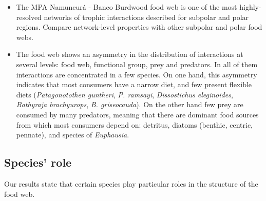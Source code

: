 \documentclass[preprint, 3p,
authoryear]{elsarticle} %
\begin{document}
\begin{itemize}
\item
  The MPA Namuncurá - Banco Burdwood food web is one of the most
  highly-resolved networks of trophic interactions described for
  subpolar and polar regions. Compare network-level properties with
  other subpolar and polar food webs.
\item
  The food web shows an asymmetry in the distribution of interactions at
  several levels: food web, functional group, prey and predators. In all
  of them interactions are concentrated in a few species. On one hand,
  this asymmetry indicates that most consumers have a narrow diet, and
  few present flexible diets (\emph{Patagonotothen guntheri}, \emph{P.
  ramsayi}, \emph{Dissostichus eleginoides}, \emph{Bathyraja
  brachyurops}, \emph{B. griseocauda}). On the other hand few prey are
  consumed by many predators, meaning that there are dominant food
  sources from which most consumers depend on: detritus, diatoms
  (benthic, centric, pennate), and species of \emph{Euphausia}.
\end{itemize}

\hypertarget{species-role}{%
\subsection{Species' role}\label{species-role}}

Our results state that certain species play particular roles in the
structure of the food web.
\end{document}
